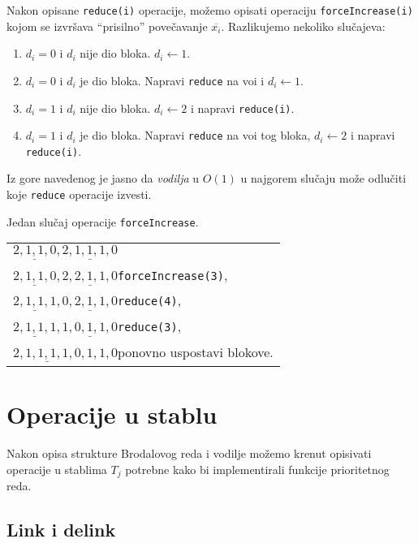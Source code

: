 Nakon opisane \texttt{reduce(i)} operacije, mo\v{z}emo opisati operaciju \texttt{forceIncrease(i)} kojom se izvr\v{s}ava ``prisilno'' pove\v{c}avanje $\overline{x_{i}}$.
Razlikujemo nekoliko slu\v{c}ajeva:
\begin{enumerate}
  \item $d_{i} = 0$ i $d_{i}$ nije dio bloka. $d_{i} \leftarrow 1$.
  \item $d_{i} = 0$ i $d_{i}$ je dio bloka. Napravi \texttt{reduce} na vo\dj i i $d_{i} \leftarrow 1$.
  \item $d_{i} = 1$ i $d_{i}$ nije dio bloka. $d_{i} \leftarrow 2$ i napravi \texttt{reduce(i)}.
  \item $d_{i} = 1$ i $d_{i}$ je dio bloka. Napravi \texttt{reduce} na vo\dj i tog bloka, $d_{i} \leftarrow 2$ i napravi \texttt{reduce(i)}.
\end{enumerate}

Iz gore navedenog je jasno da \emph{vodilja} u $O(1)$ u najgorem slu\v{c}aju mo\v{z}e odlu\v{c}iti koje \texttt{reduce} operacije izvesti.

\begin{exa}
  Jedan slu\v{c}aj operacije \texttt{forceIncrease}.
  \begin{center}
    \begin{tabular}{l}
      $\underline{2,1,1,0},\underline{2,1,1,1,0}$\\
      $\underline{2,1,1,0},\underline{2,2,1,1,0}$\qquad \texttt{forceIncrease(3)},\\
      $\underline{2,1,1,1},\underline{0,2,1,1,0}$\qquad \texttt{reduce(4)},\\
      $\underline{2,1,1,1},\underline{1,0,1,1,0}$\qquad \texttt{reduce(3)},\\
      $\underline{2,1,1,1,1,0},1,1,0$\qquad ponovno uspostavi blokove.\\
    \end{tabular}
  \end{center}
\end{exa}

\section{Operacije u stablu}

Nakon opisa strukture Brodalovog reda i vodilje mo\v{z}emo krenut opisivati operacije u stablima $T_{j}$ potrebne kako bi implementirali funkcije prioritetnog reda.

\subsection{Link i delink}

